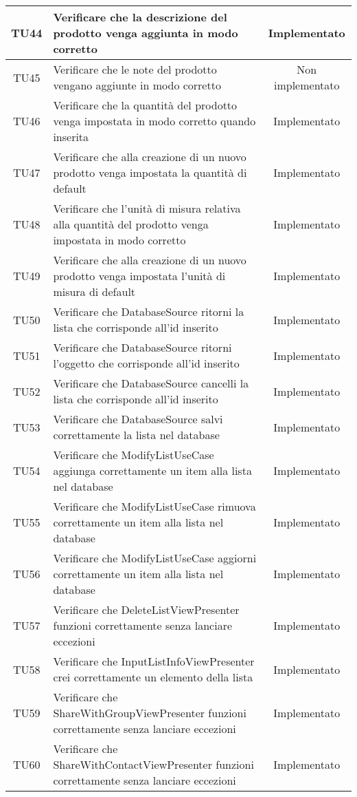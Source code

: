 \begin{center}
\begin{longtable}{|c|>{\centering}m{10cm}|c|}
		TU44 & Verificare che la descrizione del prodotto venga aggiunta in modo corretto & Implementato \\ \hline
		TU45 & Verificare che le note del prodotto vengano aggiunte in modo corretto & Non implementato \\ \hline
		TU46 & Verificare che la quantità del prodotto venga impostata in modo corretto quando inserita & Implementato \\ \hline
		TU47 & Verificare che alla creazione di un nuovo prodotto venga impostata la quantità di default & Implementato \\ \hline
		TU48 & Verificare che l'unità di misura relativa alla quantità del prodotto venga impostata in modo corretto & Implementato \\ \hline
		TU49 & Verificare che alla creazione di un nuovo prodotto venga impostata l'unità di misura di default & Implementato \\ \hline
		TU50 & Verificare che DatabaseSource ritorni la lista che corrisponde all'id inserito & Implementato \\ \hline
		TU51 & Verificare che DatabaseSource ritorni l'oggetto che corrisponde all'id inserito & Implementato \\ \hline
		TU52 & Verificare che DatabaseSource cancelli la lista che corrisponde all'id inserito & Implementato \\ \hline
		TU53 & Verificare che DatabaseSource salvi correttamente la lista nel database & Implementato \\ \hline
		TU54 & Verificare che ModifyListUseCase aggiunga correttamente un item alla lista nel database & Implementato \\ \hline
		TU55 & Verificare che ModifyListUseCase rimuova correttamente un item alla lista nel database & Implementato \\ \hline
		TU56 & Verificare che ModifyListUseCase aggiorni correttamente un item alla lista nel database & Implementato \\ \hline
		TU57 & Verificare che DeleteListViewPresenter funzioni correttamente senza lanciare eccezioni & Implementato \\ \hline
		TU58 & Verificare che InputListInfoViewPresenter crei correttamente un elemento della lista & Implementato \\ \hline
		TU59 & Verificare che ShareWithGroupViewPresenter funzioni correttamente senza lanciare eccezioni & Implementato \\ \hline
		TU60 & Verificare che ShareWithContactViewPresenter funzioni correttamente senza lanciare eccezioni & Implementato \\ \hline
	\end{longtable}
\end{center}

